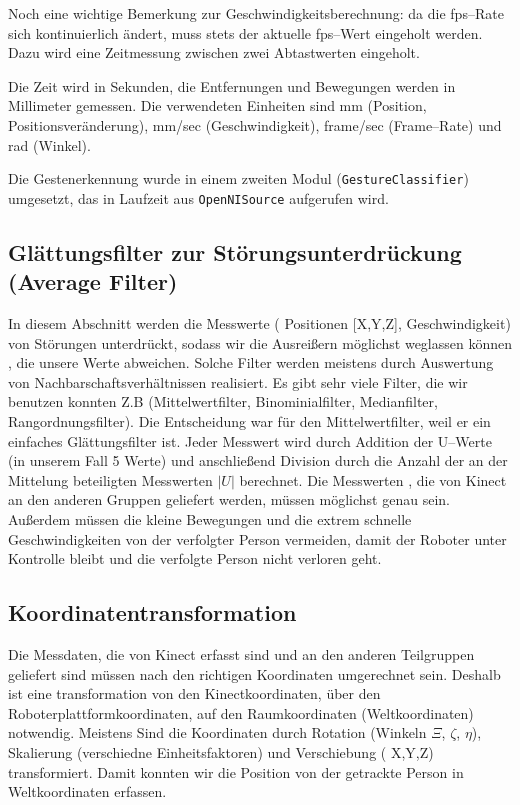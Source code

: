 Noch eine wichtige Bemerkung zur Geschwindigkeitsberechnung: da die \gls{fps}--Rate
 sich kontinuierlich ändert, muss stets der aktuelle \gls{fps}--Wert eingeholt werden.
 Dazu wird eine Zeitmessung zwischen zwei Abtastwerten eingeholt.

Die Zeit wird in Sekunden, die Entfernungen und Bewegungen werden in Millimeter gemessen.
 Die verwendeten Einheiten sind mm (Position, Positionsveränderung), mm/sec
 (Geschwindigkeit), frame/sec (Frame--Rate) und rad (Winkel).

Die Gestenerkennung wurde in einem zweiten Modul (\lstinline{GestureClassifier})
umgesetzt, das in Laufzeit aus \lstinline{OpenNISource} aufgerufen wird.


\subsection{Glättungsfilter zur Störungsunterdrückung (Average Filter)}
\authorsection{\editorhamza}

In diesem Abschnitt werden die Messwerte ( Positionen [X,Y,Z], Geschwindigkeit) von Störungen unterdrückt, sodass wir die  Ausreißern möglichst weglassen  können , die unsere Werte abweichen. Solche Filter werden meistens durch Auswertung von Nachbarschaftsverhältnissen realisiert. 
Es gibt sehr viele Filter, die wir benutzen konnten Z.B (Mittelwertfilter, Binominialfilter, Medianfilter, Rangordnungsfilter). Die Entscheidung war für den Mittelwertfilter, weil er ein einfaches Glättungsfilter ist. Jeder Messwert wird durch Addition der U--Werte (in unserem Fall 5 Werte)  und anschließend Division durch die Anzahl der an der Mittelung beteiligten Messwerten $|U|$ berechnet.
Die Messwerten , die von Kinect an den anderen Gruppen geliefert werden, müssen möglichst genau sein. Außerdem müssen die kleine Bewegungen und die extrem schnelle Geschwindigkeiten von der verfolgter Person vermeiden, damit der Roboter unter Kontrolle bleibt und die verfolgte Person nicht verloren geht.


\subsection{ Koordinatentransformation}
\authorsection{\editorhamza}

Die Messdaten, die von Kinect erfasst sind und an den anderen Teilgruppen geliefert sind müssen nach den richtigen Koordinaten umgerechnet sein. Deshalb ist eine transformation von den Kinectkoordinaten, über den Roboterplattformkoordinaten, auf den Raumkoordinaten (Weltkoordinaten) notwendig. Meistens Sind die Koordinaten durch Rotation (Winkeln $\Xi$, $\zeta$, $\eta$),  Skalierung (verschiedne Einheitsfaktoren) und  Verschiebung ( X,Y,Z) transformiert. Damit konnten wir die Position von der getrackte Person in Weltkoordinaten erfassen.


